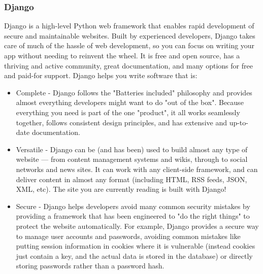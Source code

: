 \documentclass[12pt, a4paper]{report}
\begin{document}
\subsubsection{Django}
Django is a high-level Python web framework that enables rapid development of secure and maintainable websites. Built by experienced developers, Django takes care of much of the hassle of web development, so you can focus on writing your app without needing to reinvent the wheel. It is free and open source, has a thriving and active community, great documentation, and many options for free and paid-for support. \newline Django helps you write software that is:
\begin{itemize}
	\item Complete - Django follows the "Batteries included" philosophy and provides almost everything developers might want to do "out of the box". Because everything you need is part of the one "product", it all works seamlessly together, follows consistent design principles, and has extensive and up-to-date documentation.
	\item Versatile - Django can be (and has been) used to build almost any type of website — from content management systems and wikis, through to social networks and news sites. It can work with any client-side framework, and can deliver content in almost any format (including HTML, RSS feeds, JSON, XML, etc). The site you are currently reading is built with Django!
	\item Secure - Django helps developers avoid many common security mistakes by providing a framework that has been engineered to "do the right things" to protect the website automatically. For example, Django provides a secure way to manage user accounts and passwords, avoiding common mistakes like putting session information in cookies where it is vulnerable (instead cookies just contain a key, and the actual data is stored in the database) or directly storing passwords rather than a password hash.
	

\end{itemize}
\end{document}
